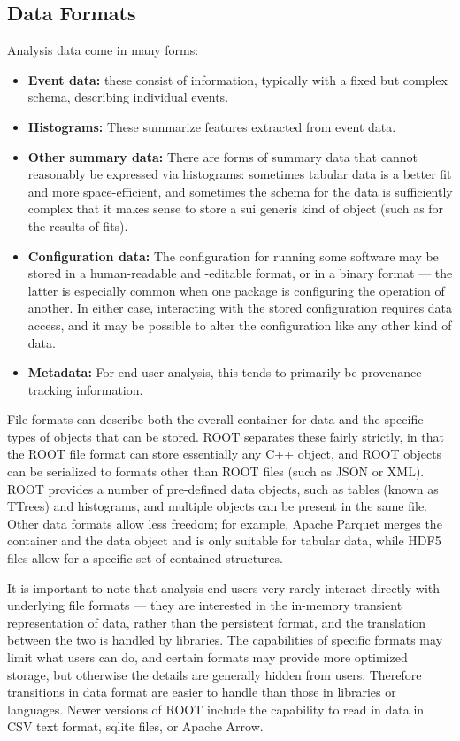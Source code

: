 \subsection{Data Formats}
Analysis data come in many forms:
\begin{itemize}
\item \textbf{Event data:} these consist of information, typically with a fixed but complex schema, describing individual events.
\item \textbf{Histograms:} These summarize features extracted from event data.
\item \textbf{Other summary data:} There are forms of summary data that cannot reasonably be expressed via histograms: sometimes tabular data is a better fit and more space-efficient, and sometimes the schema for the data is sufficiently complex that it makes sense to store a sui generis kind of object (such as for the results of fits).
\item \textbf{Configuration data:} The configuration for running some software may be stored in a human-readable and -editable format, or in a binary format --- the latter is especially common when one package is configuring the operation of another. In either case, interacting with the stored configuration requires data access, and it may be possible to alter the configuration like any other kind of data. 
\item \textbf{Metadata:} For end-user analysis, this tends to primarily be provenance tracking information.
\end{itemize}

File formats can describe both the overall container for data and the specific types of objects that can be stored. ROOT separates these fairly strictly, in that the ROOT file format can store essentially any C++ object, and ROOT objects can be serialized to formats other than ROOT files (such as JSON or XML). ROOT provides a number of pre-defined data objects, such as tables (known as TTrees) and histograms, and multiple objects can be present in the same file. Other data formats allow less freedom; for example, Apache Parquet merges the container and the data object and is only suitable for tabular data, while HDF5 files allow for a specific set of contained structures.

It is important to note that analysis end-users very rarely interact directly with underlying file formats --- they are interested in the in-memory transient representation of data, rather than the persistent format, and the translation between the two is handled by libraries. The capabilities of specific formats may limit what users can do, and certain formats may provide more optimized storage, but otherwise the details are generally hidden from users. Therefore transitions in data format are easier to handle than those in libraries or languages. Newer versions of ROOT include the capability to read in data in CSV text format, sqlite files, or Apache Arrow.

